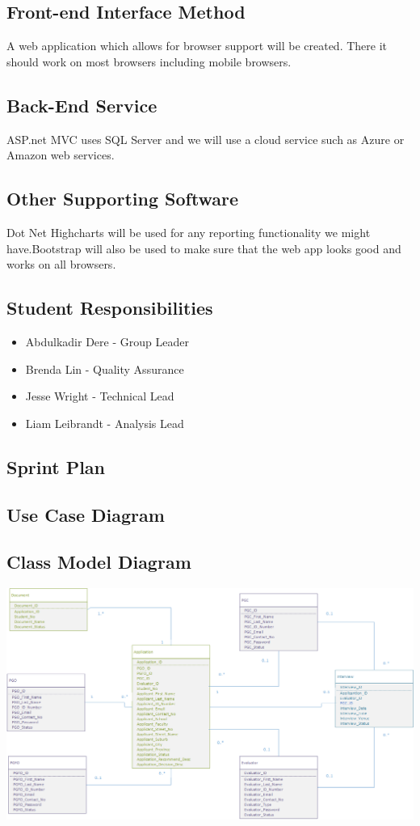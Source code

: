\documentclass{article}
\begin{document}
\subsection{Front-end Interface Method}
A web application which allows for browser support will be created. There it should work on most browsers including mobile browsers.
\subsection{Back-End Service}
ASP.net MVC uses SQL Server and we will use a cloud service such as Azure or Amazon web services.
\subsection{Other Supporting Software}
Dot Net Highcharts will be used for any reporting functionality we might have.Bootstrap will also be used to make sure that the web app looks good and works on all browsers. \\
\subsection{Student Responsibilities}
\begin{itemize}
\item Abdulkadir Dere - Group Leader
\item Brenda Lin - Quality Assurance
\item Jesse Wright - Technical Lead
\item Liam Leibrandt - Analysis Lead
\end{itemize}
\subsection{Sprint Plan}
\subsection{Use Case Diagram}
\subsection{Class Model Diagram}
\includegraphics[scale=0.5]{ERD.png} \\
\end{document}
